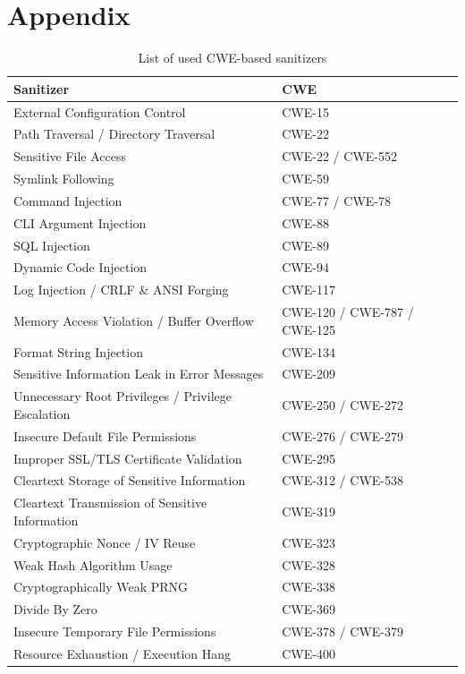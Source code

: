 \section{Appendix}

\begin{table}[htbp]
\centering
\caption{List of used CWE-based sanitizers}
\begin{tabular}{ll}
\toprule
\textbf{Sanitizer} & \textbf{CWE} \\
\midrule
External Configuration Control & CWE-15 \\
Path Traversal / Directory Traversal & CWE-22 \\
Sensitive File Access & CWE-22 / CWE-552 \\
Symlink Following & CWE-59 \\
Command Injection & CWE-77 / CWE-78 \\
CLI Argument Injection & CWE-88 \\
SQL Injection & CWE-89 \\
Dynamic Code Injection & CWE-94 \\
Log Injection / CRLF \& ANSI Forging & CWE-117 \\
Memory Access Violation / Buffer Overflow & CWE-120 / CWE-787 / CWE-125 \\
Format String Injection & CWE-134 \\
Sensitive Information Leak in Error Messages & CWE-209 \\
Unnecessary Root Privileges / Privilege Escalation & CWE-250 / CWE-272 \\
Insecure Default File Permissions & CWE-276 / CWE-279 \\
Improper SSL/TLS Certificate Validation & CWE-295 \\
Cleartext Storage of Sensitive Information & CWE-312 / CWE-538 \\
Cleartext Transmission of Sensitive Information & CWE-319 \\
Cryptographic Nonce / IV Reuse & CWE-323 \\
Weak Hash Algorithm Usage & CWE-328 \\
Cryptographically Weak PRNG & CWE-338 \\
Divide By Zero & CWE-369 \\
Insecure Temporary File Permissions & CWE-378 / CWE-379 \\
Resource Exhaustion / Execution Hang & CWE-400 \\

\end{tabular}
\end{table}
